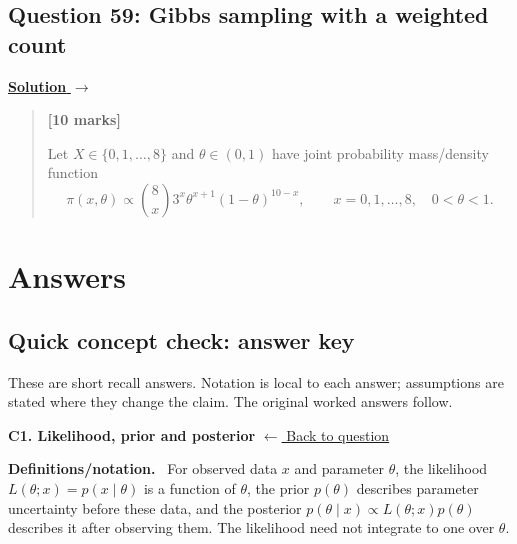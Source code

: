 \documentclass[11pt,a4paper]{article}
\newcommand{\given}{\mathrel{|}}
\newcommand{\partmarks}[1]{%
  \unskip\nobreak\hfill\penalty50\hskip1em\null\nobreak\hfill
  \mbox{\textbf{[#1]}}}
\newenvironment{examquestion}[2]
  {\subsection{#1}\label{question:\arabic{subsection}}\label{#2}%
   \noindent\hyperref[answer:\arabic{subsection}]{\textbf{Solution} $\rightarrow$}%
   \begin{quote}\color{statgrey}}
  {\end{quote}}
\newcommand{\concepttopic}[1]{%
  \par\addvspace{8pt}\noindent{\color{statblue}\bfseries #1}\par\nobreak\smallskip}
\newenvironment{conceptanswer}[2]
  {\par\addvspace{10pt}\noindent\begin{minipage}{\linewidth}%
   \hypertarget{concept-answer:#1}{}%
   \textcolor{statblue}{\textbf{C#1. #2}}\hfill%
   {\footnotesize\hyperlink{concept-question:#1}{$\leftarrow$ Back to question}}%
   \par\smallskip\textbf{Definitions/notation.}\ }
  {\end{minipage}\par}
\begin{document}
\clearpage

\begin{examquestion}{Question 59: Gibbs sampling with a weighted count}{question:practice-gibbs-sampling-with-a-weighted-count}
\textbf{[10 marks]}

Let $X\in\{0,1,\ldots,8\}$ and $\theta\in(0,1)$ have joint probability
mass/density function
\[
\pi(x,\theta)\propto
\binom8x3^x\theta^{x+1}(1-\theta)^{10-x},
\qquad x=0,1,\ldots,8,\quad0<\theta<1.
\]

\end{examquestion}

\clearpage

\section{Answers}

\subsection*{Quick concept check: answer key}
These are short recall answers. Notation is local to each answer; assumptions
are stated where they change the claim. The original worked answers follow.

\concepttopic{Bayesian foundations}
\begin{conceptanswer}{1}{Likelihood, prior and posterior}
For observed data $x$ and parameter $\theta$, the likelihood
$L(\theta;x)=p(x\mid\theta)$ is a function of $\theta$, the prior $p(\theta)$
describes parameter uncertainty before these data, and the posterior
$p(\theta\mid x)\propto L(\theta;x)p(\theta)$ describes it after observing them.
The likelihood need not integrate to one over $\theta$.
\end{conceptanswer}
\end{document}
